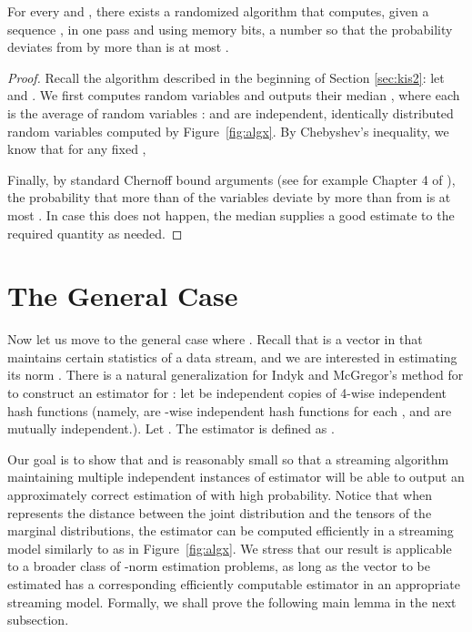 \def\draft{0}  \documentclass[proceedings]{stacs}
\theoremstyle{plain}\newtheorem{satz}[thm]{Satz}
\theoremstyle{definition}\newtheorem{crucial}[thm]{Crucial Definition}
\begin{document}
\begin{theorem}\label{thm:case2} For every  and , there exists a randomized algorithm
that computes, given a sequence , in one pass and using 
memory bits, a number  so that the probability  deviates from  by more than  is at most .
\end{theorem}
\begin{proof}
Recall the algorithm described in the beginning of Section \ref{sec:kis2}: let  and .
We first computes  random variables  and
outputs their median , where each  is the average of  random variables :  and  are independent, identically
distributed random variables computed by Figure~\ref{fig:algx}. By Chebyshev's inequality, we know that for any fixed ,

Finally, by standard Chernoff bound arguments (see for example Chapter 4 of \cite{MU05}), the probability that more than 
of the variables  deviate by more than  from  is at most . In case this does not happen,
the median  supplies a good estimate to the required quantity  as needed.
\end{proof}


\section{The General Case }\label{sec:estimator}

Now let us move to the general case where . Recall that  is a vector in  that maintains certain statistics of a data stream, and we are interested in estimating its  norm . There is a natural generalization for Indyk and McGregor's method for  to construct an estimator for : let  be independent copies of 4-wise independent hash functions (namely,  are -wise independent hash functions for each , and  are mutually independent.).  Let . The estimator  is defined as .

Our goal is to show that  and  is reasonably small so that a streaming algorithm maintaining multiple independent instances of estimator  will be able to output an approximately correct estimation of  with high probability. Notice that when  represents the  distance between the joint distribution and the tensors of the marginal distributions, the estimator can be computed efficiently in a streaming model similarly to as in  Figure~\ref{fig:algx}. We stress that our result is applicable to a broader class of -norm estimation problems, as long as the vector  to be estimated has a corresponding efficiently computable estimator  in an appropriate streaming model. Formally, we shall prove the following main lemma in the next subsection.
\end{document}
